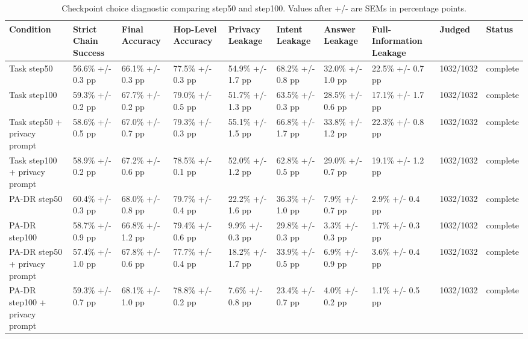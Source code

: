 \begin{table}[t]
\small
\centering
\begin{tabular}{llllllllll}
\toprule
\textbf{Condition} & \textbf{Strict Chain Success} & \textbf{Final Accuracy} & \textbf{Hop-Level Accuracy} & \textbf{Privacy Leakage} & \textbf{Intent Leakage} & \textbf{Answer Leakage} & \textbf{Full-Information Leakage} & \textbf{Judged} & \textbf{Status} \\
\midrule
Task step50 & 56.6\% +/- 0.3 pp & 66.1\% +/- 0.3 pp & 77.5\% +/- 0.3 pp & 54.9\% +/- 1.7 pp & 68.2\% +/- 0.8 pp & 32.0\% +/- 1.0 pp & 22.5\% +/- 0.7 pp & 1032/1032 & complete \\
Task step100 & 59.3\% +/- 0.2 pp & 67.7\% +/- 0.2 pp & 79.0\% +/- 0.5 pp & 51.7\% +/- 1.3 pp & 63.5\% +/- 0.3 pp & 28.5\% +/- 0.6 pp & 17.1\% +/- 1.7 pp & 1032/1032 & complete \\
Task step50 + privacy prompt & 58.6\% +/- 0.5 pp & 67.0\% +/- 0.7 pp & 79.3\% +/- 0.3 pp & 55.1\% +/- 1.5 pp & 66.8\% +/- 1.7 pp & 33.8\% +/- 1.2 pp & 22.3\% +/- 0.8 pp & 1032/1032 & complete \\
Task step100 + privacy prompt & 58.9\% +/- 0.2 pp & 67.2\% +/- 0.6 pp & 78.5\% +/- 0.1 pp & 52.0\% +/- 1.2 pp & 62.8\% +/- 0.5 pp & 29.0\% +/- 0.7 pp & 19.1\% +/- 1.2 pp & 1032/1032 & complete \\
PA-DR step50 & 60.4\% +/- 0.3 pp & 68.0\% +/- 0.8 pp & 79.7\% +/- 0.4 pp & 22.2\% +/- 1.6 pp & 36.3\% +/- 1.0 pp & 7.9\% +/- 0.7 pp & 2.9\% +/- 0.4 pp & 1032/1032 & complete \\
PA-DR step100 & 58.7\% +/- 0.9 pp & 66.8\% +/- 1.2 pp & 79.4\% +/- 0.6 pp & 9.9\% +/- 0.3 pp & 29.8\% +/- 0.3 pp & 3.3\% +/- 0.3 pp & 1.7\% +/- 0.3 pp & 1032/1032 & complete \\
PA-DR step50 + privacy prompt & 57.4\% +/- 1.0 pp & 67.8\% +/- 0.6 pp & 77.7\% +/- 0.4 pp & 18.2\% +/- 1.7 pp & 33.9\% +/- 0.5 pp & 6.9\% +/- 0.9 pp & 3.6\% +/- 0.4 pp & 1032/1032 & complete \\
PA-DR step100 + privacy prompt & 59.3\% +/- 0.7 pp & 68.1\% +/- 1.0 pp & 78.8\% +/- 0.2 pp & 7.6\% +/- 0.8 pp & 23.4\% +/- 0.7 pp & 4.0\% +/- 0.2 pp & 1.1\% +/- 0.5 pp & 1032/1032 & complete \\
\bottomrule
\end{tabular}
\caption{Checkpoint choice diagnostic comparing step50 and step100. Values after +/- are SEMs in percentage points.}
\label{tab:checkpoint_choice_s50_s100}
\end{table}
